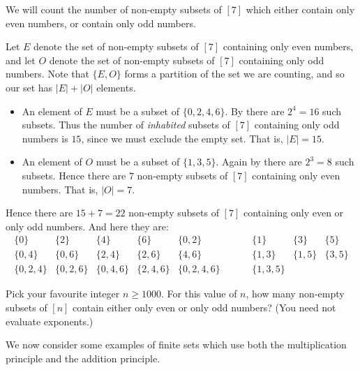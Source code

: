 \begin{example}
We will count the number of non-empty subsets of $[7]$ which either contain only even numbers, or contain only odd numbers.

Let $E$ denote the set of non-empty subsets of $[7]$ containing only even numbers, and let $O$ denote the set of non-empty subsets of $[7]$ containing only odd numbers. Note that $\{ E, O \}$ forms a partition of the set we are counting, and so our set has $|E|+|O|$ elements.
\begin{itemize}
\item An element of $E$ must be a subset of $\{0,2,4,6\}$. By  there are $2^4=16$ such subsets. Thus the number of \textit{inhabited} subsets of $[7]$ containing only odd numbers is $15$, since we must exclude the empty set. That is, $|E|=15$.
\item An element of $O$ must be a subset of $\{1,3,5\}$. Again by  there are $2^3=8$ such subsets. Hence there are $7$ non-empty subsets of $[7]$ containing only even numbers. That is, $|O|=7$.
\end{itemize}
Hence there are $15+7=22$ non-empty subsets of $[7]$ containing only even or only odd numbers. And here they are:
\[ \begin{matrix}
\{ 0 \} & \{ 2 \} & \{ 4 \} & \{ 6 \} & \{ 0, 2 \} & \hspace{20pt} & \{ 1 \} & \{ 3 \} & \{ 5 \} \\
\{ 0, 4 \} & \{ 0, 6 \} & \{ 2, 4 \} & \{ 2, 6 \} & \{ 4, 6 \} && \{ 1, 3 \} & \{ 1, 5 \} & \{ 3, 5 \} \\
\{ 0, 2, 4 \} & \{ 0, 2, 6 \} & \{ 0, 4, 6 \} & \{ 2, 4, 6 \} & \{ 0, 2, 4, 6\} && \{ 1, 3, 5 \} && 
\end{matrix} \]
\end{example}

\begin{exercise}
Pick your favourite integer $n \ge 1000$. For this value of $n$, how many non-empty subsets of $[n]$ contain either only even or only odd numbers? (You need not evaluate exponents.)
\end{exercise}

We now consider some examples of finite sets which use both the multiplication principle and the addition principle.

